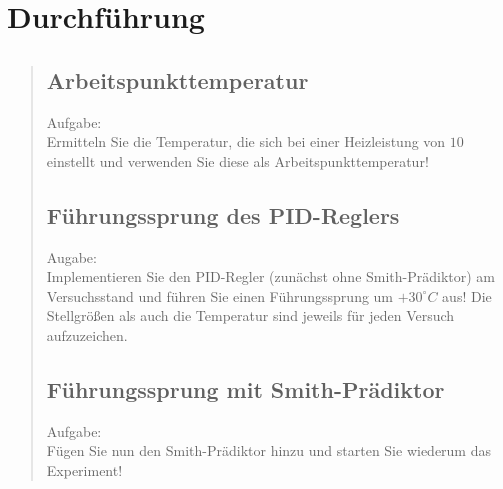 \section{Durchführung}
\begin{quote}
    
    
    \subsection{Arbeitspunkttemperatur}
    
    Aufgabe:\\
    Ermitteln Sie die Temperatur, die sich bei einer Heizleistung von $10$ einstellt und verwenden Sie diese als
    Arbeitspunkttemperatur!\vspace{1em}
    
    \begin{quote}
        
    \end{quote}
    
    
    \subsection{Führungssprung des PID-Reglers}
    
    Augabe:\\
    Implementieren Sie den PID-Regler (zunächst ohne Smith-Prädiktor) am Versuchsstand und führen Sie einen
    Führungssprung um $+30^{\circ} C$ aus! Die Stellgrößen als auch die Temperatur sind jeweils für jeden Versuch
    aufzuzeichen.\vspace{1em}
    
    \begin{quote}
        
    \end{quote}
    
    
    \subsection{Führungssprung mit Smith-Prädiktor}
    
    Aufgabe:\\
    Fügen Sie nun den Smith-Prädiktor hinzu und starten Sie wiederum das Experiment!\vspace{1em}
    
    \begin{quote}
        
    \end{quote}
    
    

\end{quote}
